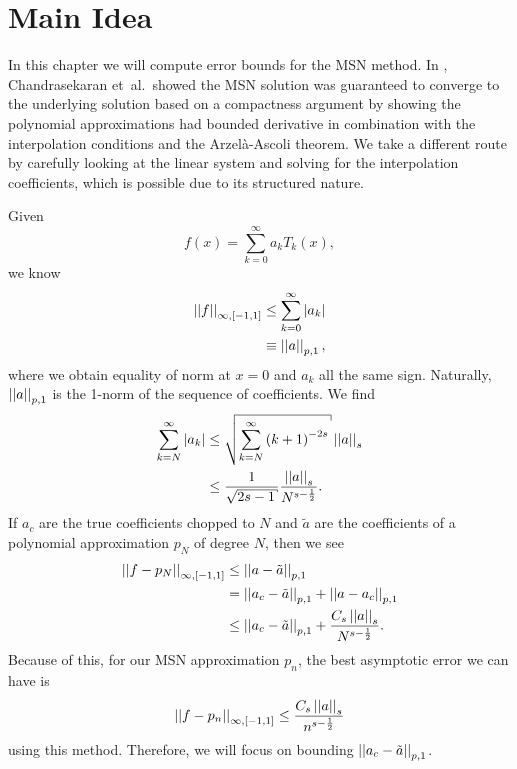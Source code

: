 \section{Main Idea}
\label{sec:cvip_main}

In this chapter we will compute error bounds for the MSN method.
In \cite{msnInterp}, Chandrasekaran et~al.~showed the MSN
solution was guaranteed to converge to the underlying solution
based on a compactness argument by showing the polynomial
approximations had bounded derivative in combination with the
interpolation conditions and the Arzel\`{a}-Ascoli theorem.
We take a different route by carefully looking at the
linear system and solving for the interpolation coefficients,
which is possible due to its structured nature.

Given
%
\begin{equation}
    f(x) = \sum_{k=0}^{\infty} a_{k}T_{k}(x),
\end{equation}
%
we know
%
\begin{align}
    \left| \left| f \right| \right|_{\infty,[-1,1]} &\le \sum_{k=0}^{\infty} \left| a_{k} \right| \nonumber\\
        &\equiv \left| \left| a \right| \right|_{p,1},
\end{align}
%
where we obtain equality of norm at $x=0$ and $a_{k}$ all the same sign.
Naturally, $\left| \left| a \right| \right|_{p,1}$ is the 1-norm of the sequence of coefficients.
We find
%
\begin{align}
    \sum_{k=N}^{\infty} \abs{a_{k}}
        &\le \sqrt{\sum_{k=N}^{\infty} \parens{k+1}^{-2s}}\norm{a}_{s}
        \nonumber\\
    &\le \frac{1}{\sqrt{2s-1}}\frac{\norm{a}_{s}}{N^{s-\frac{1}{2}}}.
    \label{eq:cvip_main_large_bound}
\end{align}
%
If $a_{c}$ are the true coefficients chopped to $N$ and $\tilde{a}$
are the coefficients of a polynomial approximation $p_{N}$ of degree $N$,
then we see
%
\begin{align}
    \left| \left| f-p_{N} \right| \right|_{\infty,[-1,1]} &\le \left| \left| a-\tilde{a} \right| \right|_{p,1} \nonumber\\
        &= \left| \left| a_{c}-\tilde{a} \right| \right|_{p,1} + \left| \left| a-a_{c} \right| \right|_{p,1} \nonumber\\
    &\le \left| \left| a_{c}-\tilde{a} \right| \right|_{p,1}
        + \frac{C_{s}\left| \left| a \right| \right|_{s}}{N^{s-\frac{1}{2}}}.
\end{align}
%
Because of this, for our MSN approximation $p_{n}$,
the best asymptotic error we can have is
%
\begin{equation}
    \left| \left| f-p_{n} \right| \right|_{\infty,[-1,1]}
        \le \frac{C_{s}\left| \left| a \right| \right|_{s}}{n^{s-\frac{1}{2}}}
\end{equation}
%
using this method.
Therefore, we will focus on bounding $\left| \left| a_{c}-\tilde{a} \right| \right|_{p,1}$.

